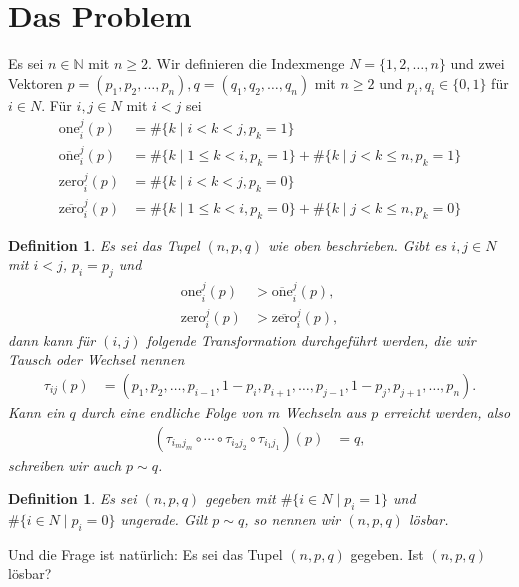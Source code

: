 \documentclass[12pt]{article}
\newtheorem{defn}[thm]{Definition}
\begin{document}
\section{Das Problem}
Es sei $n\in\mathbb{N}$ mit $n\geq 2$. Wir definieren die Indexmenge $N=\{1, 2,\dots, n\}$ und zwei Vektoren $p = (p_1, p_2, \dots, p_n), q = (q_1, q_2, \dots, q_n)$ mit $n\geq 2$ und $p_i, q_i \in \{0, 1\}$ für $i\in N$. 
Für $i,j \in N$ mit $i<j$ sei 
\begin{align*}
\mathrm{one}_i^j(p) &=   \#\{ k \mid i< k < j, p_k=1 \}
\\
\overline{\mathrm{one}}_i^j(p) &=  \#\{ k \mid 1\leq k<i, p_k=1 \}
+
\#\{ k \mid j< k\leq n, p_k=1 \}
\\
\mathrm{zero}_i^j(p) 
&=   \#\{ k\mid i< k < j, p_k=0 \}
\\
\overline{\mathrm{zero}}_i^j(p) 
&=   \#\{ k\mid 1\leq k < i, p_k=0 \}
+  \#\{ k\mid j< k \leq n, p_k=0 \}
\end{align*}

\begin{defn}
Es sei das Tupel $(n, p, q)$ wie oben beschrieben.
Gibt es $i, j \in N$ mit $i<j$, $p_i = p_j$ und
\begin{align}
\mathrm{one}_i^{j}(p)
&> 
\overline{\mathrm{one}}_i^{j}(p),
\label{eq:Voraussetzung für Tausch -> ones_greater}
\\
\mathrm{zero}_i^{j}(p)
&> 
\overline{\mathrm{zero}}_i^{j}(p),
\label{eq:Voraussetzung für Tausch -> zeros_greater}
\end{align}
dann kann für $(i, j)$ folgende Transformation durchgeführt werden, die wir Tausch oder Wechsel nennen
\begin{align*}
\tau_{ij}(p) 
&= (p_1, p_2, \dots, p_{i-1}, 1-p_i, p_{i+1},\dots, p_{j-1}, 1-p_j, p_{j+1},\dots, p_n).
\end{align*}
Kann ein $q$ durch eine endliche Folge von $m$ Wechseln aus $p$ erreicht werden, also
\begin{align}
(\tau_{i_mj_m} \circ \cdots \circ \tau_{i_2j_2}\circ \tau_{i_1j_1}) (p) 
&= 
q,
\label{eq:p=q durch wechsel}
\end{align}
schreiben wir auch $p\sim q$.
\end{defn}

\begin{defn}
Es sei $(n, p, q)$ gegeben mit $\#\{ i \in N\mid p_i=1 \}$ und $\#\{ i \in N\mid p_i=0 \}$ ungerade.
Gilt $p\sim q$, so nennen wir $(n, p, q)$ lösbar.
\label{defn:problembeschreibung}
\end{defn}
\noindent Und die Frage ist natürlich: Es sei das Tupel $(n, p, q)$ gegeben. Ist $(n, p, q)$ lösbar?
\end{document}
